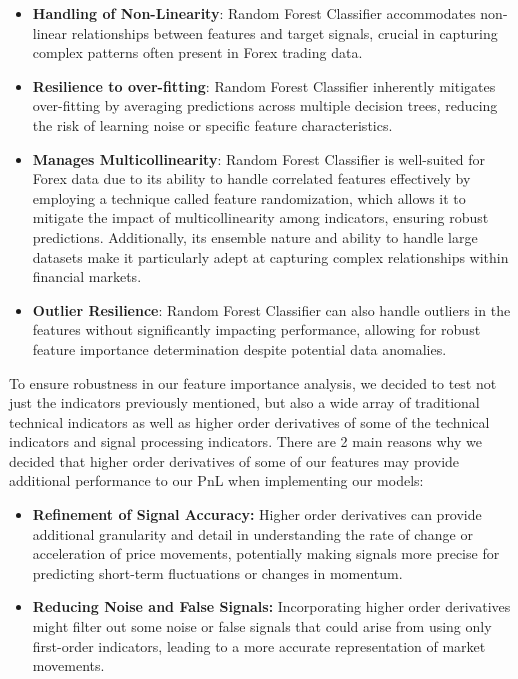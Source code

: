 \documentclass{article}
\begin{document}
\begin{itemize}
    \item \textbf{Handling of Non-Linearity}: Random Forest Classifier accommodates non-linear relationships between features and target signals, crucial in capturing complex patterns often present in Forex trading data.
    \item \textbf{Resilience to over-fitting}: Random Forest Classifier inherently mitigates over-fitting by averaging predictions across multiple decision trees, reducing the risk of learning noise or specific feature characteristics.
    \item \textbf{Manages Multicollinearity}: Random Forest Classifier is well-suited for Forex data due to its ability to handle correlated features effectively by employing a technique called feature randomization, which allows it to mitigate the impact of multicollinearity among indicators, ensuring robust predictions. Additionally, its ensemble nature and ability to handle large datasets make it particularly adept at capturing complex relationships within financial markets.
    \item \textbf{Outlier Resilience}: Random Forest Classifier can also handle outliers in the features without significantly impacting performance, allowing for robust feature importance determination despite potential data anomalies.
\end{itemize}

\noindent To ensure robustness in our feature importance analysis, we decided to test not just the indicators previously mentioned, but also a wide array of traditional technical indicators as well as higher order derivatives of some of the technical indicators and signal processing indicators. There are 2 main reasons why we decided that higher order derivatives of some of our features may provide additional performance to our PnL when implementing our models:

\begin{itemize}
    \item \textbf{Refinement of Signal Accuracy:} Higher order derivatives can provide additional granularity and detail in understanding the rate of change or acceleration of price movements, potentially making signals more precise for predicting short-term fluctuations or changes in momentum.

    \item \textbf{Reducing Noise and False Signals:} Incorporating higher order derivatives might filter out some noise or false signals that could arise from using only first-order indicators, leading to a more accurate representation of market movements.
\end{itemize}
\end{document}
